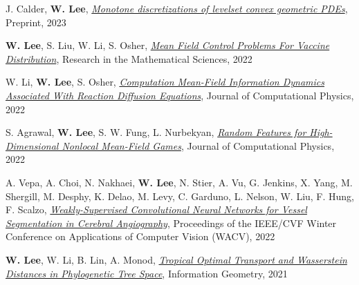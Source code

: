 

\begin{cvparagraph}

\vspace{0.5cm}
\begin{cvitems}
  \item J. Calder, \textbf{W. Lee}, \href{https://arxiv.org/abs/2310.08450}{\textit{Monotone discretizations of levelset convex geometric PDEs}}, Preprint, 2023
    \medskip
  \item \textbf{W. Lee}, S. Liu, W. Li, S. Osher, \href{https://arxiv.org/pdf/2104.11887.pdf}{\textit{Mean Field Control Problems For Vaccine Distribution}}, Research in the Mathematical Sciences, 2022
    \medskip
    \item W. Li, \textbf{W. Lee}, S. Osher, \href{https://arxiv.org/pdf/2107.11501.pdf}{\textit{Computation Mean-Field Information Dynamics Associated With Reaction Diffusion Equations}}, Journal of Computational Physics, 2022
    \medskip
    \item S. Agrawal, \textbf{W. Lee}, S. W. Fung, L. Nurbekyan, \href{https://arxiv.org/abs/2202.12529}{\textit{Random Features for High-Dimensional Nonlocal Mean-Field Games}}, Journal of Computational Physics, 2022
    \medskip
    \item A. Vepa, A. Choi, N. Nakhaei, \textbf{W. Lee}, N. Stier, A. Vu, G. Jenkins, X. Yang, M. Shergill, M. Desphy, K. Delao, M. Levy, C. Garduno, L. Nelson, W. Liu, F. Hung, F. Scalzo, \href{https://openaccess.thecvf.com/content/WACV2022/html/Vepa_Weakly-Supervised_Convolutional_Neural_Networks_for_Vessel_Segmentation_in_Cerebral_Angiography_WACV_2022_paper.html}{\textit{Weakly-Supervised Convolutional Neural Networks for Vessel Segmentation in Cerebral Angiography}}, Proceedings of the IEEE/CVF Winter Conference on Applications of Computer Vision (WACV), 2022
    \medskip
    \item \textbf{W. Lee}, W. Li, B. Lin, A. Monod, \href{https://arxiv.org/pdf/1911.05401v1.pdf}{\textit{Tropical Optimal Transport and Wasserstein Distances in Phylogenetic Tree Space}}, {Information Geometry}, 2021

\end{cvitems}
\end{cvparagraph}
